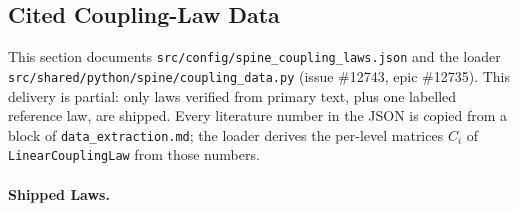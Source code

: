 \subsection{Cited Coupling-Law Data}
\label{sec:spn-3}

This section documents \texttt{src/config/spine\_coupling\_laws.json} and the
loader \texttt{src/shared/python/spine/coupling\_data.py} (issue \#12743, epic
\#12735). This delivery is partial: only laws verified from primary text, plus
one labelled reference law, are shipped. Every literature number in the JSON is
copied from a block of \texttt{data\_extraction.md}; the loader derives the
per-level matrices $C_i$ of \texttt{LinearCouplingLaw} from those numbers.

\paragraph{Shipped Laws.}
